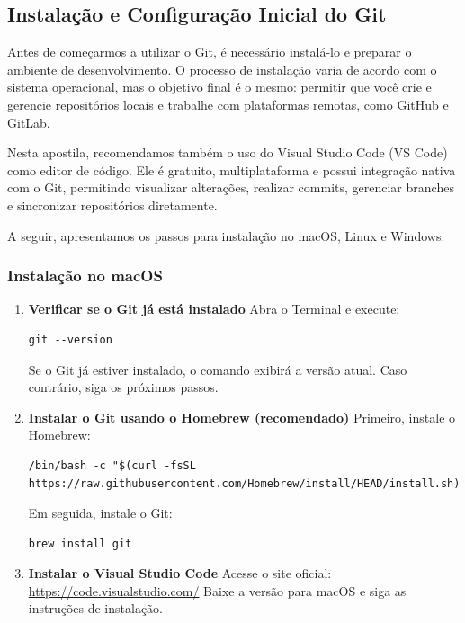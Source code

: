 \subsection{Instalação e Configuração Inicial do Git}

Antes de começarmos a utilizar o Git, é necessário instalá-lo e preparar o ambiente de desenvolvimento. O processo de instalação varia de acordo com o sistema operacional, mas o objetivo final é o mesmo: permitir que você crie e gerencie repositórios locais e trabalhe com plataformas remotas, como GitHub e GitLab.

Nesta apostila, recomendamos também o uso do Visual Studio Code (VS Code) como editor de código. Ele é gratuito, multiplataforma e possui integração nativa com o Git, permitindo visualizar alterações, realizar commits, gerenciar branches e sincronizar repositórios diretamente.

A seguir, apresentamos os passos para instalação no macOS, Linux e Windows.

\subsubsection*{Instalação no macOS}

\begin{enumerate}
    \item \textbf{Verificar se o Git já está instalado}  
    Abra o Terminal e execute:
    \begin{lstlisting}[style=shellstyle]
 git --version
    \end{lstlisting}
    Se o Git já estiver instalado, o comando exibirá a versão atual. Caso contrário, siga os próximos passos.

    \item \textbf{Instalar o Git usando o Homebrew (recomendado)}  
    Primeiro, instale o Homebrew:
    \begin{lstlisting}[style=shellstyle]
/bin/bash -c "$(curl -fsSL https://raw.githubusercontent.com/Homebrew/install/HEAD/install.sh)"
    \end{lstlisting}
    Em seguida, instale o Git:
    \begin{lstlisting}[style=shellstyle]
brew install git
    \end{lstlisting}

    \item \textbf{Instalar o Visual Studio Code}  
    Acesse o site oficial:  
    \url{https://code.visualstudio.com/}  
    Baixe a versão para macOS e siga as instruções de instalação.
\end{enumerate}

